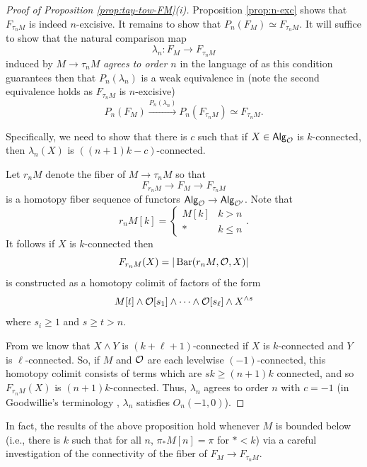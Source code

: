 \begin{proof} [Proof of Proposition \ref{prop:tay-tow-FM}(i)] Proposition \ref{prop:n-exc} shows that $F_{\tau_n M}$ is indeed $n$-excisive. It remains to show that $P_n(F_M)\simeq F_{\tau_n M}$. It will suffice to show that the natural comparison map \[\lambda_n \colon F_M \to F_{\tau_n M} \] induced by $M\to \tau_n M$ \textit{agrees to order $n$} in the language of \cite{Goo-Calc3} as this condition guarantees then that $P_n(\lambda_n)$ is a weak equivalence in (note the second equivalence holds as $F_{\tau_n M}$ is $n$-excisive) \[ P_n(F_M)\xrightarrow{P_n(\lambda_n)} P_n(F_{\tau_n M})\simeq F_{\tau_n M}.\]

Specifically, we need to show that there is $c$ such that if $X\in {\mathsf{Alg}_{\mathcal{O}}}$ is $k$-connected, then $\lambda_n(X)$ is $((n+1)k-c)$-connected. 

Let $r_n  M$ denote the fiber of $M \to \tau_n M$ so that \[ F_{r_n M} \to F_{M} \to F_{\tau_n M}\] is a homotopy fiber sequence of functors ${\mathsf{Alg}_{\mathcal{O}}}\to {\mathsf{Alg}_{\mathcal{O'}}}$. Note that \[r_n  M[k] =\begin{cases} M[k] & k>n \\ * & k\leq n  \end{cases}.\] It follows if $X$ is $k$-connected then \[F_{r_n M} (X)=|\operatorname{Bar}(r_n  M, \mathcal{O}, X)|\]
is constructed as a homotopy colimit of factors of the form \[ M[t]\wedge \mathcal{O}[s_1]\wedge \cdots \wedge \mathcal{O}[s_{\ell}]\wedge X^{\wedge s}\]
where $s_i\geq 1$ and $s\geq t>n$. 

From \cite{Har-Hess} we know that $X\wedge Y$ is $(k+\ell+1)$-connected if $X$ is $k$-connected and $Y$ is $\ell$-connected. So, if $M$ and $\mathcal{O}$ are each levelwise $(-1)$-connected, this homotopy colimit consists of terms which are $sk\geq (n+1)k$ connected, and so $F_{r_n M}(X)$ is $(n+1)k$-connected. Thus, $\lambda_n$ agrees to order $n$ with $c=-1$ (in Goodwillie's terminology \cite{Goo-Calc3}, $\lambda_n$ satisfies $O_n(-1,0)$).
\end{proof} 

\begin{remark}In fact, the results of the above proposition hold whenever $M$ is bounded below (i.e., there is $k$ such that for all $n$, $\pi_* M[n]=\pi$ for $*<k$) via a careful investigation of the connectivity of the fiber of $F_M\to F_{\tau_n M}$.\end{remark}